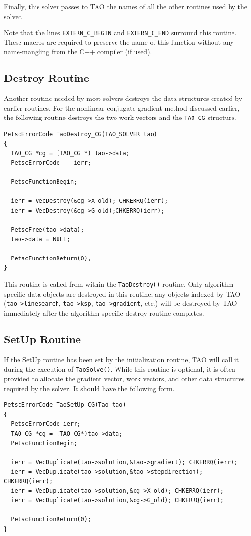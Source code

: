 \documentclass[]{book}
\begin{document}
Finally, this solver passes to TAO the names of all the other routines
used by the solver.  

Note that the lines {\tt EXTERN\_C\_BEGIN} and {\tt EXTERN\_C\_END} surround
this routine.  These macros are required to preserve the name of this
function without any name-mangling from the C++ compiler (if used).

\subsection{Destroy Routine}
Another routine needed by most solvers destroys the data structures
created by earlier routines.  For the nonlinear conjugate gradient
method discussed earlier, the following routine destroys the two
work vectors and the {\tt TAO\_CG} structure.
\begin{verbatim}
PetscErrorCode TaoDestroy_CG(TAO_SOLVER tao)
{
  TAO_CG *cg = (TAO_CG *) tao->data;
  PetscErrorCode    ierr;

  PetscFunctionBegin;

  ierr = VecDestroy(&cg->X_old); CHKERRQ(ierr);
  ierr = VecDestroy(&cg->G_old);CHKERRQ(ierr);

  PetscFree(tao->data);
  tao->data = NULL;

  PetscFunctionReturn(0);
}
\end{verbatim}
This routine is called from within the {\tt TaoDestroy()} routine.
Only algorithm-specific data objects are destroyed in this
routine; any objects indexed by TAO ({\tt tao->linesearch}, {\tt tao->ksp}, {\tt tao->gradient}, etc.)
will be destroyed by TAO immediately after the algorithm-specific destroy 
routine completes.


\subsection{SetUp Routine}
If the SetUp routine has been set by the initialization routine, TAO
will call it during the execution of \texttt{TaoSolve()}.
While this routine is optional, it is often provided to allocate
the gradient vector, work vectors, and other data structures 
required by the solver.
It should have the following form.
\begin{verbatim}
PetscErrorCode TaoSetUp_CG(Tao tao)
{
  PetscErrorCode ierr;
  TAO_CG *cg = (TAO_CG*)tao->data;
  PetscFunctionBegin;

  ierr = VecDuplicate(tao->solution,&tao->gradient); CHKERRQ(ierr);
  ierr = VecDuplicate(tao->solution,&tao->stepdirection); CHKERRQ(ierr);
  ierr = VecDuplicate(tao->solution,&cg->X_old); CHKERRQ(ierr);
  ierr = VecDuplicate(tao->solution,&cg->G_old); CHKERRQ(ierr);

  PetscFunctionReturn(0);
}
\end{verbatim}
\end{document}

